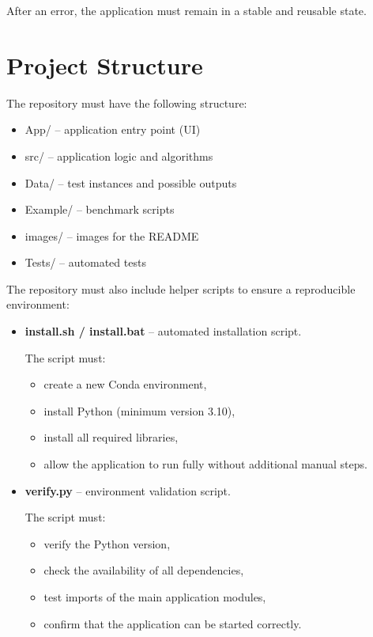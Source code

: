 \documentclass[12pt,a4paper]{article}
\begin{document}
After an error, the application must remain in a stable and reusable state.

\section{Project Structure}

The repository must have the following structure:

\begin{itemize}
    \item App/ -- application entry point (UI)
    \item src/ -- application logic and algorithms
    \item Data/ -- test instances and possible outputs
    \item Example/ -- benchmark scripts
    \item images/ -- images for the README
    \item Tests/ -- automated tests
\end{itemize}

The repository must also include helper scripts to ensure a reproducible environment:

\begin{itemize}
    \item \textbf{install.sh / install.bat} -- automated installation script.
    
    The script must:
    \begin{itemize}
        \item create a new Conda environment,
        \item install Python (minimum version 3.10),
        \item install all required libraries,
        \item allow the application to run fully without additional manual steps.
    \end{itemize}

    \item \textbf{verify.py} -- environment validation script.
    
    The script must:
    \begin{itemize}
        \item verify the Python version,
        \item check the availability of all dependencies,
        \item test imports of the main application modules,
        \item confirm that the application can be started correctly.
    \end{itemize}
\end{itemize}
\end{document}
